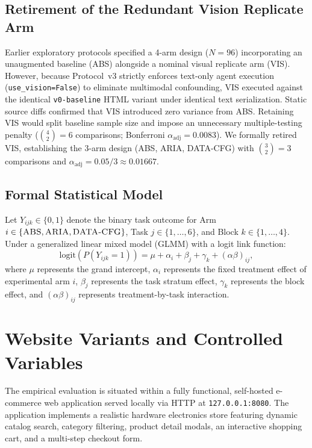 \documentclass[11pt,a4paper]{article}
\begin{document}
\subsection{Retirement of the Redundant Vision Replicate Arm}
Earlier exploratory protocols specified a 4-arm design ($N=96$) incorporating an unaugmented baseline (\textsc{ABS}) alongside a nominal visual replicate arm (\textsc{VIS}). However, because Protocol~v3 strictly enforces text-only agent execution (\texttt{use\_vision=False}) to eliminate multimodal confounding, \textsc{VIS} executed against the identical \texttt{v0-baseline} HTML variant under identical text serialization. Static source diffs confirmed that \textsc{VIS} introduced zero variance from \textsc{ABS}. Retaining \textsc{VIS} would split baseline sample size and impose an unnecessary multiple-testing penalty ($\binom{4}{2}=6$ comparisons; Bonferroni $\alpha_{\text{adj}} = 0.0083$). We formally retired \textsc{VIS}, establishing the 3-arm design (\textsc{ABS}, \textsc{ARIA}, \textsc{DATA-CFG}) with $\binom{3}{2}=3$ comparisons and $\alpha_{\text{adj}} = 0.05/3 \approx 0.01667$.

\subsection{Formal Statistical Model}
Let $Y_{ijk} \in \{0, 1\}$ denote the binary task outcome for Arm $i \in \{\textsc{ABS}, \textsc{ARIA}, \textsc{DATA-CFG}\}$, Task $j \in \{1, \dots, 6\}$, and Block $k \in \{1, \dots, 4\}$. Under a generalized linear mixed model (GLMM) with a logit link function:
\begin{equation}
\text{logit}\left(P(Y_{ijk} = 1)\right) = \mu + \alpha_i + \beta_j + \gamma_k + (\alpha\beta)_{ij},
\end{equation}
where $\mu$ represents the grand intercept, $\alpha_i$ represents the fixed treatment effect of experimental arm $i$, $\beta_j$ represents the task stratum effect, $\gamma_k$ represents the block effect, and $(\alpha\beta)_{ij}$ represents treatment-by-task interaction.

\section{Website Variants and Controlled Variables}
\label{sec:variants}

The empirical evaluation is situated within a fully functional, self-hosted e-commerce web application served locally via HTTP at \texttt{127.0.0.1:8080}. The application implements a realistic hardware electronics store featuring dynamic catalog search, category filtering, product detail modals, an interactive shopping cart, and a multi-step checkout form.
\end{document}
